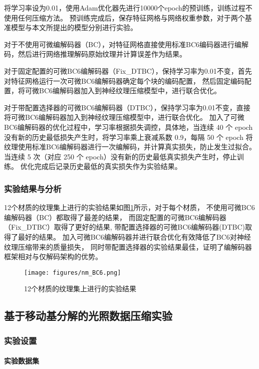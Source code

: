 将学习率设为0.01，使用Adam优化器先进行10000个epoch的预训练，训练过程不使用任何压缩方法。
预训练完成后，保存特征网格与网络权重参数，对于两个基准模型与本文所提出的模型分别进行实验。

对于不使用可微编解码器（BC），对特征网格直接使用标准BC6编码器进行编解码，然后进行网络推理解码原始纹理并计算误差作为结果。

对于固定配置的可微BC6编解码器（Fix\_DTBC），保持学习率为0.01不变，首先对特征网格运行一次可微BC6编解码器确定每个块的编码配置，
然后固定编码配置，将可微BC6编解码器加入到神经纹理压缩模型中，进行联合优化。

对于带配置选择器的可微BC6编解码器（DTBC），保持学习率为0.01不变，直接将可微BC6编解码器加入到神经纹理压缩模型中，进行联合优化。
加入了可微BC6编解码器的优化过程中，学习率根据损失调控，具体地，当连续 40 个 epoch 没有新的历史最低损失产生时，将学习率乘上衰减系数 0.9，每隔 50 个 epoch 将纹理使用标准BC6编解码器进行一次编解码，并计算真实损失，防止发生过拟合。当连续 5 次（对应 250 个 epoch）没有新的历史最低真实损失产生时，停止训练。
优化完成后记录历史最低的真实损失作为实验结果。

\subsubsection{实验结果与分析}

12个材质的纹理集上进行的实验结果如图\ref{fig:nm_BC6}所示，对于每个材质，
不使用可微BC6编解码器（BC）都取得了最差的结果，
而固定配置的可微BC6编解码器（Fix\_DTBC）取得了更好的结果,
带配置选择器的可微BC6编解码器(DTBC)取得了最好的结果。
加入可微BC6编解码器并进行联合优化有效降低了BC6对神经纹理压缩带来的质量损失，
同时带配置选择器的实验结果最佳，证明了编解码器框架相对与仅解码架构的优势。


\begin{figure}[htbp]
    \centering
    \texttt{[image: figures/nm\_BC6.png]}
    \caption{12个材质的纹理集上进行的实验结果}
    \label{fig:nm_BC6}
\end{figure}


\subsection{基于移动基分解的光照数据压缩实验}

\subsubsection{实验设置}

\paragraph{实验数据集}

